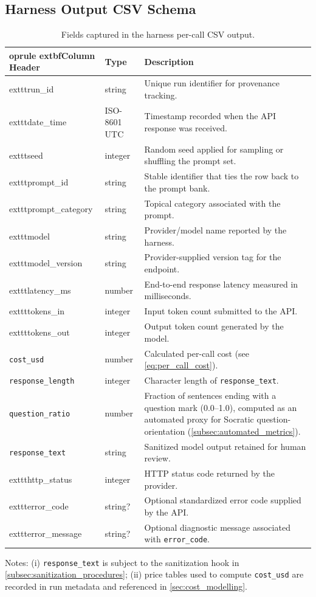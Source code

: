 \subsection{Harness Output CSV Schema}\label{app:csv_schema}

\begin{table}[h!]
\centering
\caption{Fields captured in the harness per-call CSV output.
\label{tab:csv_schema}}
\begin{tabularx}{\textwidth}{@{}l l X@{}}
	oprule
	extbf{Column Header} & \textbf{Type} & \textbf{Description} \\ \midrule
	exttt{run\_id} & string & Unique run identifier for provenance tracking. \\
	exttt{date\_time} & ISO-8601 UTC & Timestamp recorded when the API response was received. \\
	exttt{seed} & integer & Random seed applied for sampling or shuffling the prompt set. \\
	exttt{prompt\_id} & string & Stable identifier that ties the row back to the prompt bank. \\
	exttt{prompt\_category} & string & Topical category associated with the prompt. \\
	exttt{model} & string & Provider/model name reported by the harness. \\
	exttt{model\_version} & string & Provider-supplied version tag for the endpoint. \\
	exttt{latency\_ms} & number & End-to-end response latency measured in milliseconds. \\
	exttt{tokens\_in} & integer & Input token count submitted to the API. \\
	exttt{tokens\_out} & integer & Output token count generated by the model. \\
	\texttt{cost\_usd} & number & Calculated per-call cost (see \cref{eq:per_call_cost}). \\
	\texttt{response\_length} & integer & Character length of \texttt{response\_text}. \\
	\texttt{question\_ratio} & number & Fraction of sentences ending with a question mark (0.0--1.0), computed as an automated proxy for Socratic question-orientation (\cref{subsec:automated_metrics}). \\
	\texttt{response\_text} & string & Sanitized model output retained for human review. \\
	exttt{http\_status} & integer & HTTP status code returned by the provider. \\
	exttt{error\_code} & string? & Optional standardized error code supplied by the API. \\
	exttt{error\_message} & string? & Optional diagnostic message associated with \texttt{error\_code}. \\
\bottomrule
\end{tabularx}
\end{table}

Notes: (i) \texttt{response\_text} is subject to the sanitization hook in \cref{subsec:sanitization_procedures}; (ii) price tables used to compute \texttt{cost\_usd} are recorded in run metadata and referenced in \cref{sec:cost_modelling}.


